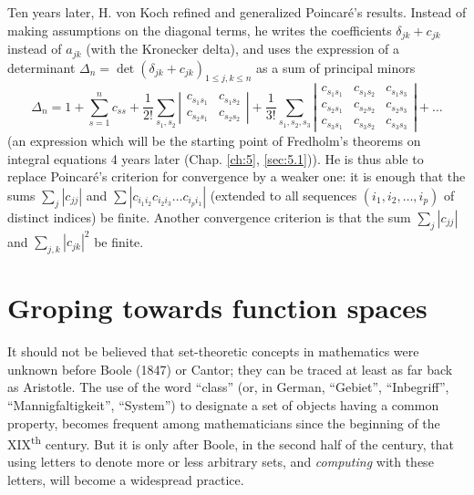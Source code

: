 \documentclass[12pt,a4paper,leqno,twoside]{extbook}
\newcommand{\supth}{\texorpdfstring{\textsuperscript{th}}{th}}
\begin{document}
Ten years later, H. von Koch \cite{220} refined and generalized Poincaré's results. Instead of making assumptions on the diagonal terms, he writes the coefficients \(\delta_{jk} + c_{jk}\) instead of \(a_{jk}\) (with the Kronecker delta), and uses the expression of a determinant \(\Delta_n = \det(\delta_{jk} + c_{jk})_{1 \leq j, k \leq n}\) as a sum of principal minors
\begin{equation}
    \label{eq:4.9}
    \Delta_n = 1 + \sum_{s=1}^n c_{ss} + \frac{1}{2!} \sum_{s_1, s_2}
    \left|
    \begin{matrix}
        c_{s_1 s_1} & c_{s_1 s_2} \\
        c_{s_2 s_1} & c_{s_2 s_2}
    \end{matrix}
    \right|
    + \frac{1}{3!} \sum_{s_1, s_2, s_3}
    \left|
    \begin{matrix}
        c_{s_1 s_1} & c_{s_1 s_2} & c_{s_1 s_3} \\
        c_{s_2 s_1} & c_{s_2 s_2} & c_{s_2 s_3} \\
        c_{s_3 s_1} & c_{s_3 s_2} & c_{s_3 s_3}
    \end{matrix}
    \right|
    + \ldots
\end{equation}
(an expression which will be the starting point of Fredholm's theorems on integral equations 4 years later (Chap. \ref{ch:5}, \ref{sec:5.1})). He is thus able to replace Poincaré's criterion for convergence by a weaker one: it is enough that the sums \(\sum\limits_j |c_{jj}|\) and \(\sum |c_{i_1 i_2} c_{i_2 i_3} \ldots c_{i_p i_1}|\) (extended to all sequences \((i_1, i_2, \ldots, i_p)\) of distinct indices) be finite. Another convergence criterion is that the sum \(\sum\limits_j |c_{jj}|\) and \(\sum_{j,k} |c_{jk}|^2\) be finite.

\section{Groping towards function spaces}
\label{sec:4.3}

It should not be believed that set-theoretic concepts in mathematics were unknown before Boole (1847) or Cantor; they can be traced at least as far back as Aristotle. The use of the word ``class'' (or, in German, ``Gebiet'', ``Inbegriff'', ``Mannigfaltigkeit'', ``System'') to designate a set of objects having a common property, becomes frequent among mathematicians since the beginning of the XIX\supth{} century. But it is only after Boole, in the second half of the century, that using letters to denote more or less arbitrary sets, and \emph{computing} with these letters, will become a widespread practice.
\end{document}
